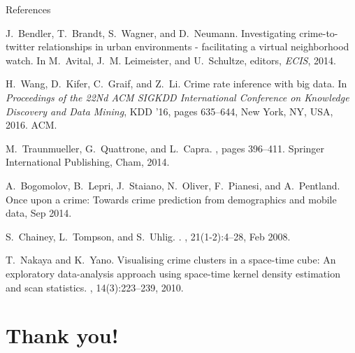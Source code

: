 \documentclass[10pt,ignorenonframetext,]{beamer}
\begin{document}
\begin{frame}{%
\protect\hypertarget{references}{%
References}}

\begin{thebibliography}{1}

J.~Bendler, T.~Brandt, S.~Wagner, and D.~Neumann.
\newblock Investigating crime-to-twitter relationships in urban environments -
  facilitating a virtual neighborhood watch.
\newblock In M.~Avital, J.~M. Leimeister, and U.~Schultze, editors, {\em ECIS},
  2014.

H.~Wang, D.~Kifer, C.~Graif, and Z.~Li.
\newblock Crime rate inference with big data.
\newblock In {\em Proceedings of the 22Nd ACM SIGKDD International Conference
  on Knowledge Discovery and Data Mining}, KDD '16, pages 635--644, New York,
  NY, USA, 2016. ACM.

M.~Traunmueller, G.~Quattrone, and L.~Capra.
, pages 396--411.
\newblock Springer International Publishing, Cham, 2014.
\end{thebibliography}

\end{frame}

\begin{frame}

\begin{thebibliography}{1}
A.~Bogomolov, B.~Lepri, J.~Staiano, N.~Oliver, F.~Pianesi, and A.~Pentland.
\newblock Once upon a crime: Towards crime prediction from demographics and
  mobile data, Sep 2014.

S.~Chainey, L.~Tompson, and S.~Uhlig.
.
, 21(1-2):4--28, Feb 2008.

T.~Nakaya and K.~Yano.
\newblock Visualising crime clusters in a space-time cube: An exploratory
  data-analysis approach using space-time kernel density estimation and scan
  statistics.
, 14(3):223--239, 2010.
\end{thebibliography}

\end{frame}

\hypertarget{thank-you}{%
\section{Thank you!}\label{thank-you}}
\end{document}
